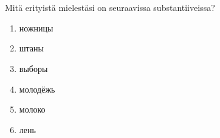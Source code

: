 \section{}

Mitä erityistä mielestäsi on seuraavissa substantiiveissa?

\begin{enumerate}
    \item ножницы
    \item штаны
    \item выборы
    \item молодёжь
    \item молоко
    \item лень
\end{enumerate}
